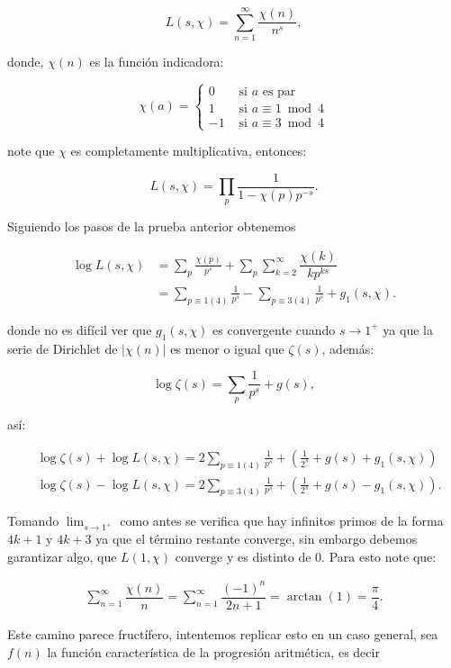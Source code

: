 $$
L(s, \chi)=\sum_{n=1}^{\infty} \frac{\chi(n)}{n^s},
$$

donde, $\chi(n)$ es la función indicadora:

$$
\chi(a)= \begin{cases}0 & \text { si } a \text { es par } \\ 1 & \text { si } a \equiv 1 \bmod 4 \\ -1 & \text { si } a \equiv 3 \bmod 4\end{cases}
$$

note que $\chi$ es completamente multiplicativa, entonces:

$$
L(s, \chi)=\prod_p \frac{1}{1-\chi(p) p^{-s}}.
$$

Siguiendo los pasos de la prueba anterior obtenemos

\begin{align*}
    \log L(s, \chi)&=\sum_p \frac{\chi(p)}{p^s}+\sum_p\sum_{k=2}^{\infty}\dfrac{\chi(k)}{kp^{ks}}\\
    &=\sum_{p\equiv 1(4)}\frac{1}{p^s}- \sum_{p\equiv 3(4)}\frac{1}{p^s}+g_1(s,\chi)
.\end{align*}

donde no es difícil ver que $g_1(s,\chi)$ es convergente cuando $s\to 1^{+}$ ya que la serie de Dirichlet de $|\chi(n)|$ es menor o igual que $\zeta(s)$, además:

$$\log \zeta(s)=\sum_p \frac{1}{p^s}+g(s),$$

así:

$$\begin{aligned}
& \log \zeta(s)+\log L(s, \chi)=2 \sum_{p \equiv 1(4)} \frac{1}{p^s}+\left(\frac{1}{2^s}+g(s)+g_1(s, \chi)\right) \\
& \log \zeta(s)-\log L(s, \chi)=2 \sum_{p \equiv 3(4)} \frac{1}{p^s}+\left(\frac{1}{2^s}+g(s)-g_1(s, \chi)\right).
\end{aligned}$$

Tomando $\lim_{s\to 1^{+}}$ como antes se verifica que hay infinitos primos de la forma $4k+1$ y $4k+3$ ya que el término restante converge, sin embargo debemos garantizar algo, que $L(1,\chi)$ converge y es distinto de 0. Para esto note  que:

\begin{align*}
    \sum_{n=1}^{\infty}\dfrac{\chi(n)}{n}=\sum_{n=1}^{\infty}\dfrac{(-1)^n}{2n+1}=\arctan(1)=\dfrac{\pi}{4}
.\end{align*}

Este camino parece fructífero, intentemos replicar esto en un caso general, sea $f(n)$ la función característica de la progresión aritmética, es decir

